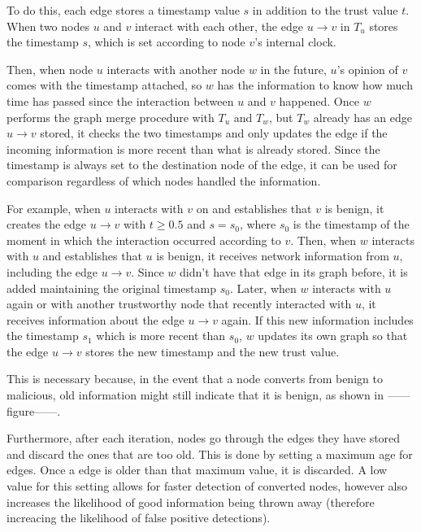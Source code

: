 To do this, each edge stores a timestamp value $s$ in addition to the trust value $t$.
When two nodes $u$ and $v$ interact with each other, the edge $u\rightarrow v$ in $T_u$ stores the timestamp $s$, which is set according to node $v$'s internal clock.

Then, when node $u$ interacts with another node $w$ in the future, $u$'s opinion of $v$ comes with the timestamp attached, so $w$ has the information to know how much time has passed since the interaction between $u$ and $v$ happened.
Once $w$ performs the graph merge procedure with $T_u$ and $T_w$, but $T_w$ already has an edge $u\rightarrow v$ stored, it checks the two timestamps and only updates the edge if the incoming information is more recent than what is already stored.
Since the timestamp is always set to the destination node of the edge, it can be used for comparison regardless of which nodes handled the information. 

For example, when $u$ interacts with $v$ on and establishes that $v$ is benign, it creates the edge $u \rightarrow v$ with $t \geq 0.5$ and $s = s_0$, where $s_0$ is the timestamp of the moment in which the interaction occurred according to $v$.
Then, when $w$ interacts with $u$ and establishes that $u$ is benign, it receives network information from $u$, including the edge $u\rightarrow v$.
Since $w$ didn't have that edge in its graph before, it is added maintaining the original timestamp $s_0$.
Later, when $w$ interacts with $u$ again or with another trustworthy node that recently interacted with $u$, it receives information about the edge $u\rightarrow v$ again.
If this new information includes the timestamp $s_1$ which is more recent than $s_0$, $w$ updates its own graph so that the edge $u\rightarrow v$ stores the new timestamp and the new trust value.

This is necessary because, in the event that a node converts from benign to malicious, old information might still indicate that it is benign, as shown in ------figure------. 

Furthermore, after each iteration, nodes go through the edges they have stored and discard the ones that are too old.
This is done by setting a maximum age for edges.
Once a edge is older than that maximum value, it is discarded.
A low value for this setting allows for faster detection of converted nodes, however  also increases the likelihood of good information being thrown away (therefore increacing the likelihood of false positive detections).

